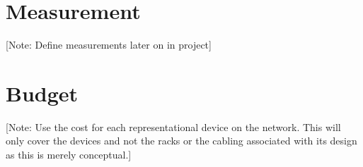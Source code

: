 \documentclass[12pt, letterpaper]{article}
\begin{document}
\newpage

\section{Measurement}
[Note: Define measurements later on in project]

\newpage

\section{Budget}
[Note: Use the cost for each representational device on the network.
This will only cover the devices and not the racks or the cabling associated with its design as this is merely conceptual.]
\end{document}
